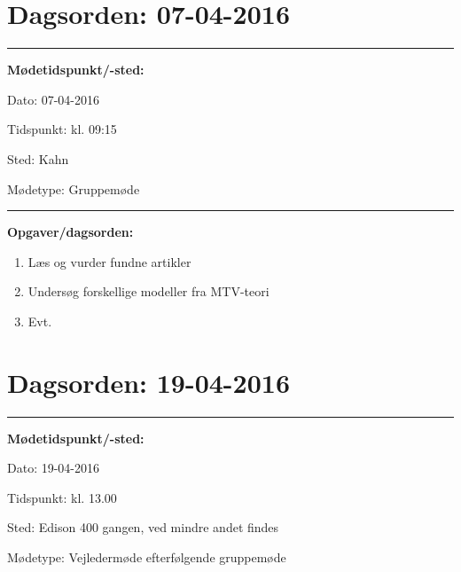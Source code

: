 \section{Dagsorden: 07-04-2016 }
\hrule
\textbf{Mødetidspunkt/-sted:} 

Dato: \tabto{7em} 07-04-2016

Tidspunkt: \tabto{7em} kl. 09:15 

Sted: \tabto{7em} Kahn

Mødetype: \tabto{7em} Gruppemøde \newline


\hrule
\textbf{Opgaver/dagsorden:} \newline
\begin{enumerate}
	\item Læs og vurder fundne artikler 
	\item Undersøg forskellige modeller fra MTV-teori
	\item Evt. 
\end{enumerate} 

\newpage 
\section{Dagsorden: 19-04-2016 }
\hrule
\textbf{Mødetidspunkt/-sted:} 

Dato: \tabto{7em} 19-04-2016

Tidspunkt: \tabto{7em} kl. 13.00 

Sted: \tabto{7em} Edison 400 gangen, ved mindre andet findes 

Mødetype: \tabto{7em} Vejledermøde efterfølgende gruppemøde\newline



